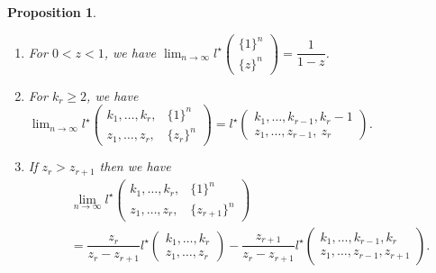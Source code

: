 \documentclass[12pt,a4paper]{article}
\newtheorem{prop}[defi]{Proposition}
\theoremstyle{remark}
\begin{document}
\begin{prop}\label{prop:limit_prop}
\begin{enumerate}
\item 
For $0<z<1$, we have
$\displaystyle \lim_{n\to \infty}    
l^{\star}
\begin{pmatrix}
\{1\}^{n}  \\
\{z\}^{n}  
\end{pmatrix}
=\dfrac{1}{1-z}$.

\item 
For $k_r \ge 2$, we have
$\displaystyle \lim_{n\to \infty}    l^{\star}\begin{pmatrix}
k_1,\ldots , k_r, &\{1\}^n \\
z_1, \ldots, z_r, &\{z_r\}^n
\end{pmatrix}
=l^{\star}\begin{pmatrix}
k_1,\ldots , k_{r-1}, k_r-1\\
z_1, \ldots, z_{r-1}, \ z_r
\end{pmatrix}
$.

\item If $z_r> z_{r+1}$ then we have
\begin{align*}
&\displaystyle \lim_{n\to \infty}    l^{\star}\begin{pmatrix}
k_1,\ldots , k_r, &\{1\}^n \\
z_1, \ldots, z_r, &\{z_{r+1}\}^n
\end{pmatrix}\\
&= 
\dfrac{z_r}{z_r-z_{r+1}}
 l^{\star}\begin{pmatrix}
k_1,\ldots , k_r\\
z_1, \ldots, z_r
\end{pmatrix}
-\dfrac{z_{r+1}}{z_r-z_{r+1}}
l^{\star}\begin{pmatrix}
k_1,\ldots, k_{r-1}, k_r\\
z_1, \ldots, z_{r-1}, z_{r+1}
\end{pmatrix}.
\end{align*} 
\end{enumerate}

\end{prop}
\end{document}
